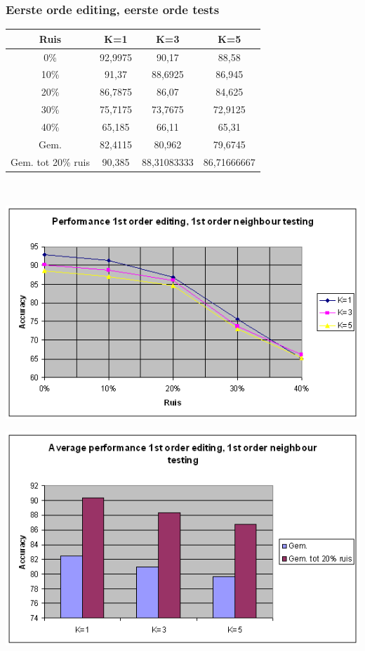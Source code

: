 \documentclass{article}
\begin{document}
\subsubsection{Eerste orde editing, eerste orde tests}
\begin{tabular}{|c|c|c|c|} \hline
Ruis & K=1 & K=3 & K=5 \\ \hline
0\% &	92,9975 &	90,17 &	88,58 \\
10\% &	91,37 &	88,6925 &	86,945 \\
20\% &	86,7875 &	86,07 &	84,625 \\
30\% &	75,7175 &	73,7675 &	72,9125 \\
40\% &	65,185 &	66,11 &	65,31 \\
Gem.	& 82,4115 &	80,962 &	79,6745 \\
Gem. tot 20\%  ruis &	90,385 &	88,31083333 &	86,71666667 \\ \hline
\end{tabular} \\

\begin{center} \includegraphics[scale=0.7]{xor_1stordedit_1stordtest_lijn} \end{center}
\begin{center} \includegraphics[scale=0.7]{xor_1stordedit_1stordtest_staaf} \end{center}
\end{document}
